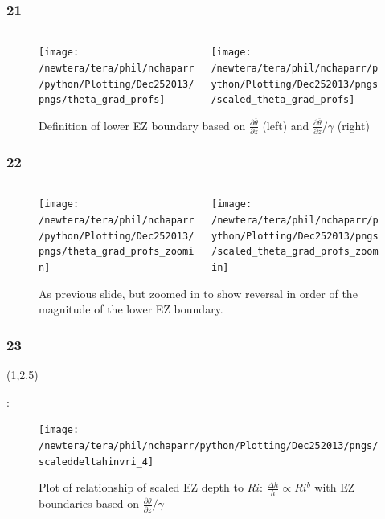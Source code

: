 \documentclass{beamer}
\newcommand\FrameText[1]{
\begin{textblock}{16}(1,2.5)
\raggedright #1
\end{textblock}}
\begin{document}
\begin{frame}
\frametitle{21}
\fontsize{12pt}{7.2}\selectfont
\begin{figure}
\begin{columns}[T]
   \begin{column}{.5\textwidth}
   \texttt{[image: /newtera/tera/phil/nchaparr/python/Plotting/Dec252013/pngs/theta\_grad\_profs]} 
   \end{column} 
   
   \begin{column}{.5\textwidth}
    \texttt{[image: /newtera/tera/phil/nchaparr/python/Plotting/Dec252013/pngs/scaled\_theta\_grad\_profs]}
   \end{column}     
\end{columns}
\caption{Definition of lower EZ boundary based on $\frac{\partial \overline{\theta}}{\partial z}$ (left) and $\frac{\partial \overline{\theta}}{\partial z}/ \gamma$ (right)}
\end{figure}
\end{frame}

\begin{frame}
\frametitle{22}
\fontsize{12pt}{7.2}\selectfont
\begin{figure}
\begin{columns}[T]
   \begin{column}{.5\textwidth}
   \texttt{[image: /newtera/tera/phil/nchaparr/python/Plotting/Dec252013/pngs/theta\_grad\_profs\_zoomin]} 
   \end{column} 
   
   \begin{column}{.5\textwidth}
    \texttt{[image: /newtera/tera/phil/nchaparr/python/Plotting/Dec252013/pngs/scaled\_theta\_grad\_profs\_zoomin]}
   \end{column}     
\end{columns}
\caption{As previous slide, but zoomed in to show reversal in order of the magnitude of the lower EZ boundary.}
\end{figure}
\end{frame}

\begin{frame}
\frametitle{23}
\fontsize{12pt}{7.2}\selectfont
\FrameText{:
}
\vspace{3mm}
\begin{figure}
\centering
\texttt{[image: /newtera/tera/phil/nchaparr/python/Plotting/Dec252013/pngs/scaleddeltahinvri\_4]}
\caption{Plot of relationship of scaled EZ depth to $Ri$: $\frac{\Delta h}{h} \propto Ri ^{b}$ with EZ boundaries based on $\frac{\partial \overline{\theta}}{\partial z}/ \gamma$}

\end{figure}

\end{frame}
\end{document}
